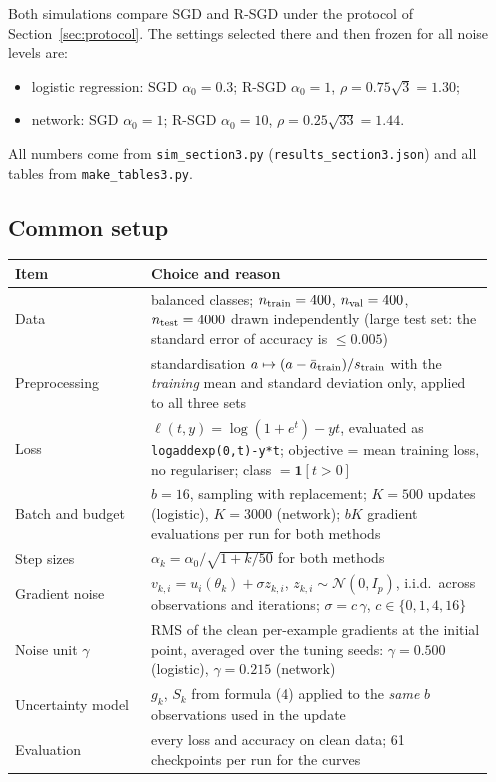 \documentclass[11pt,a4paper]{article}
\begin{document}
Both simulations compare SGD and R-SGD under the protocol of Section~\ref{sec:protocol}. The
settings selected there and then frozen for all noise levels are:
\begin{itemize}
\item logistic regression: SGD $\alpha_0=0.3$; R-SGD $\alpha_0=1$, $\rho=0.75\sqrt3=1.30$;
\item network: SGD $\alpha_0=1$; R-SGD $\alpha_0=10$, $\rho=0.25\sqrt{33}=1.44$.
\end{itemize}
All numbers come from \texttt{sim\_section3.py} (\texttt{results\_section3.json}) and all tables
from \texttt{make\_tables3.py}.

\subsection{Common setup}\label{sec:setup}


\begin{center}
\small
\begin{tabular}{@{}p{0.27\linewidth}p{0.68\linewidth}@{}}
\toprule
Item & Choice and reason \\
\midrule
Data & balanced classes; $n_{\rm train}=400$, $n_{\rm val}=400$, $n_{\rm test}=4000$ drawn
independently (large test set: the standard error of accuracy is $\le0.005$) \\
Preprocessing & standardisation $a\mapsto(a-\bar a_{\rm train})/s_{\rm train}$ with the
\emph{training} mean and standard deviation only, applied to all three sets \\
Loss & $\ell(t,y)=\log(1+e^t)-yt$, evaluated as \texttt{logaddexp(0,t)-y*t}; objective = mean
training loss, no regulariser; class $=\mathbf 1[t>0]$ \\
Batch and budget & $b=16$, sampling with replacement; $K=500$ updates (logistic), $K=3000$
(network); $bK$ gradient evaluations per run for both methods \\
Step sizes & $\alpha_k=\alpha_0/\sqrt{1+k/50}$ for both methods \\
Gradient noise & $v_{k,i}=u_i(\theta_k)+\sigma z_{k,i}$, $z_{k,i}\sim\mathcal N(0,I_p)$, i.i.d.\
across observations and iterations; $\sigma=c\,\gamma$, $c\in\{0,1,4,16\}$ \\
Noise unit $\gamma$ & RMS of the clean per-example gradients at the initial point, averaged
over the tuning seeds: $\gamma=0.500$ (logistic), $\gamma=0.215$ (network) \\
Uncertainty model & $g_k$, $S_k$ from formula (4) applied to the \emph{same} $b$ observations
used in the update \\
Evaluation & every loss and accuracy on clean data; 61 checkpoints per run for the curves \\
\bottomrule
\end{tabular}
\end{center}
\end{document}
